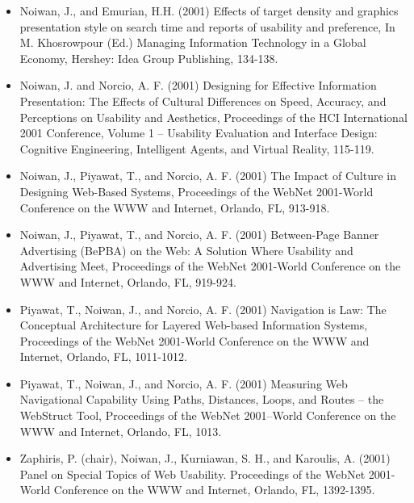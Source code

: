 \begin{appendices}
\begin{itemize}
	\item Noiwan, J., and Emurian, H.H. (2001) Effects of target density and graphics presentation style on search time and reports of usability and preference, In M. Khosrowpour (Ed.) Managing Information Technology in a Global Economy, Hershey: Idea Group Publishing, 134-138.
	\item Noiwan, J. and Norcio, A. F. (2001) Designing for Effective Information Presentation: The Effects of Cultural Differences on Speed, Accuracy, and Perceptions on Usability and Aesthetics, Proceedings of the HCI International 2001 Conference, Volume 1 – Usability Evaluation and Interface Design: Cognitive Engineering, Intelligent Agents, and Virtual Reality, 115-119.
	\item Noiwan, J., Piyawat, T., and Norcio, A. F. (2001) The Impact of Culture in Designing Web-Based Systems, Proceedings of the WebNet 2001-World Conference on the WWW and Internet, Orlando, FL, 913-918.
	\item Noiwan, J., Piyawat, T., and Norcio, A. F. (2001) Between-Page Banner Advertising (BePBA) on the Web: A Solution Where Usability and Advertising Meet, Proceedings of the WebNet 2001-World Conference on the WWW and Internet, Orlando, FL, 919-924.
	\item Piyawat, T., Noiwan, J., and Norcio, A. F. (2001) Navigation is Law: The Conceptual Architecture for Layered Web-based Information Systems, Proceedings of the WebNet 2001-World Conference on the WWW and Internet, Orlando, FL, 1011-1012.
	\item Piyawat, T., Noiwan, J., and Norcio, A. F. (2001) Measuring Web Navigational Capability Using Paths, Distances, Loops, and Routes – the WebStruct Tool, Proceedings of the WebNet 2001–World Conference on the WWW and Internet, Orlando, FL, 1013.
	\item Zaphiris, P. (chair), Noiwan, J., Kurniawan, S. H., and Karoulis, A. (2001) Panel on Special Topics of Web Usability. Proceedings of the WebNet 2001-World Conference on the WWW and Internet, Orlando, FL, 1392-1395.
\end{itemize}

\end{appendices}